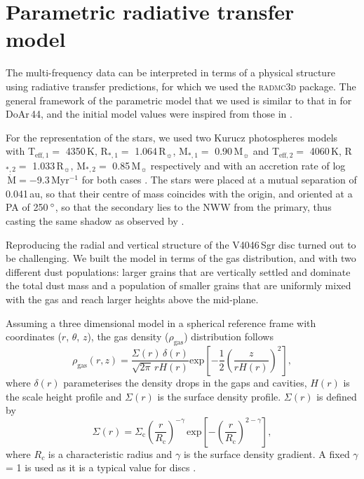 \documentclass[letters,usenatbib,times]{mnras}
\begin{document}
\section{Parametric radiative transfer model} \label{sec:model}

The multi-frequency data can be interpreted in terms of a physical structure using radiative transfer predictions, for which we used the \textsc{radmc3d} package\citep{Dullemond_2012}. The general framework of the parametric model that we used is similar to that in \citet{2018MNRAS.477.5104C} for DoAr\,44, and the initial model values were inspired from those in \citet{Rosenfeld_2013}.

For the representation of the stars, we used two Kurucz photospheres models \citep{1979ApJS...40....1K, 1997A&A...318..841C} with T$_{\mathrm{eff},1} =$ 4350\,K, R$_{*,1} =$ 1.064\,R$_{\sun}$, M$_{*,1} =$ 0.90\,M$_{\sun}$ and T$_{\mathrm{eff},2} =$ 4060\,K, R$_{*,2} =$ 1.033\,R$_{\sun}$, M$_{*,2} =$ 0.85\,M$_{\sun}$ respectively and with an accretion rate of log$\,\dot{\mathrm{M}} = -$9.3\,Myr$^{-1}$ for both cases \citep{10.1111/j.1365-2966.2011.19366.x}. The stars were placed at a  mutual separation of 0.041\,au, so that their centre of mass coincides with the origin,  and oriented at a PA of 250\,$\hbox{$^\circ$}$, so that the secondary lies to the NWW from the primary, thus casting the same shadow as observed by \citet{dOrazi}.

Reproducing  the  radial and vertical structure of the V4046\,Sgr disc turned out to be challenging.  We  built the model in terms of the gas distribution, and with  two different dust populations: larger grains that are vertically settled and dominate the total dust mass and a  population of smaller grains that are uniformly mixed with the gas and reach larger heights above the mid-plane. 

Assuming a three dimensional model in a spherical reference frame with coordinates ($r$, $\theta$, $z$), the gas density ($\rho_{\mathrm{gas}}$) distribution follows
\begin{equation}
  \rho_{\mathrm{gas}}(r,z) =\frac{\Sigma(r) \,\delta(r)}{\sqrt{2\pi} \,r H(r)}  \mathrm{exp}\left[-\frac{1}{2} \left(\frac{z}{r H(r)}\right)^2\right],
\end{equation}
where $\delta(r)$  parameterises the density drops in the gaps and cavities, $H(r)$ is the scale height profile and $\Sigma(r)$ is the surface density profile. $\Sigma(r)$ is defined by
\begin{equation}
  \Sigma(r) = \Sigma_\mathrm{c} \left(\frac{r}{R_\mathrm{c}}\right)^{-\gamma}  \, \mathrm{exp}\left[-\left(\frac{r}{R_\mathrm{c}}\right)^{2-\gamma}\right],
\end{equation}
where $R_c$ is a characteristic radius and $\gamma$ is the surface density gradient. A fixed $\gamma$ = 1 is used as it is a typical value for discs \citep{Andrews_2009,Andrews_2010}.
\end{document}
